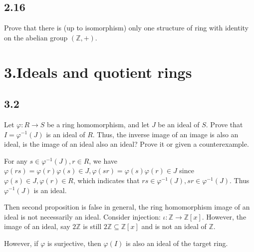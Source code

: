 \documentclass[a4paper, pdf, 12pt]{article}
\makeatletter
\renewenvironment{proof}[1][\proofname]{\par
  \pushQED{\qed}%
  \normalfont \topsep6\p@\@plus6\p@\relax
  \trivlist
  \item[%
    \hskip\labelsep
    \normalfont\bfseries %
    #1%
    \@addpunct{.}%
  ]\ignorespaces
}{%
  \popQED\endtrivlist\@endpefalse
}
\let\qed\relax %
\DeclareRobustCommand{\qed}{%
  \ifmmode \mathqed
  \else
    \leavevmode\unskip\penalty\@M\hbox{}\nobreak\hspace{.5em minus .1em}%
    \hbox{\qedsymbol}%
  \fi
}
\makeatother
\begin{document}
\subsection*{2.16}
Prove that there is (up to isomorphism) only one structure of ring with identity on the abelian group $(\mathbb{Z}, +)$.
\section*{3.Ideals and quotient rings}
\subsection*{3.2}
Let $\varphi: R \rightarrow S$ be a ring homomorphism, and let $J$ be an ideal of $S$. 
Prove that $I = \varphi^{-1}(J)$ is an ideal of $R$. Thus, the inverse image of an image is 
also an ideal, is the image of an ideal also an ideal? Prove it or given a counterexample.
\begin{proof}
  For any $s\in \varphi^{-1}(J), r\in R$, we have $\varphi(rs) = \varphi(r)\varphi(s)\in J, \varphi(sr)=\varphi(s)\varphi(r)\in J$ since $\varphi(s)\in J, \varphi(r)\in R$, which indicates 
  that $rs\in \varphi^{-1}(J),sr\in \varphi^{-1}(J)$. Thus $\varphi^{-1}(J)$ is an ideal.

  Then second proposition is false in general, the ring homomorphism image of an ideal is not necessarily
  an ideal. Consider injection: $\iota: \mathbb{Z}\rightarrow \mathbb{Z}[x]$. However, the image 
  of an ideal, say $2\mathbb{Z}$ is still $2\mathbb{Z}\subseteq \mathbb{Z}[x]$ and is not an ideal of 
  $\mathbb{Z}$.

  However, if $\varphi$ is surjective, then $\varphi(I)$ is also an ideal of the target ring.
\end{proof}
\end{document}
